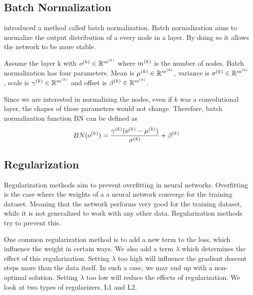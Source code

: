 \subsection{Batch Normalization}
\cite{ioffe2015batch} introduced a method called batch normalization. Batch normalization aims to normalize the output distribution of a every node in a layer. By doing so it allows the network to be more stable. 

Assume the layer k with $o^{(k)} \in \mathbb{R}^{m^{(k)}}$ where $m^{(k)}$ is the number of nodes. Batch normalization has four parameters. Mean is $\mu^{(k)} \in \mathbb{R}^{m^{(k)}}$, variance is $\sigma^{(k)} \in \mathbb{R}^{m^{(k)}}$, scale is $\gamma^{(k)} \in \mathbb{R}^{m^{(k)}}$ and offset is $\beta^{(k)} \in \mathbb{R}^{m^{(k)}}$. 

Since we are interested in normalizing the nodes, even if $k$ was a convolutional layer, the shapes of these parameters would not change. Therefore, batch normalization function $\textrm{BN}$ can be defined as 
$$ BN(o^{(k)}) = \frac{\gamma^{(k)}(o^{(k)}-\mu^{(k)})}{\sigma^{(k)}}+\beta^{(k)} $$

\iffalse
\subsubsection{Fused Batchnorm}
Instead of directly implementing the formula, they implement a more efficient version of it in Fused Batch normalization. 
\todoin{more details and better description here.}
\fi

\subsection{Regularization}
Regularization methods aim to prevent overfitting in neural networks. Overfitting is the case where the weights of a a neural network converge for the training dataset. Meaning that the network performs very good for the training dataset, while it is not generalized to work with any other data. Regularization methods try to prevent this.

One common regularization method is to add a new term to the loss, which influence the weight in certain ways. We also add a term $\lambda$ which determines the effect of this regularization. Setting $\lambda$ too high will influence the gradient descent steps more than the data itself. In such a case, we may end up with a non-optimal solution. Setting $\lambda$ too low will reduce the effects of regularization. We look at two types of regularizers, L1 and L2. 

